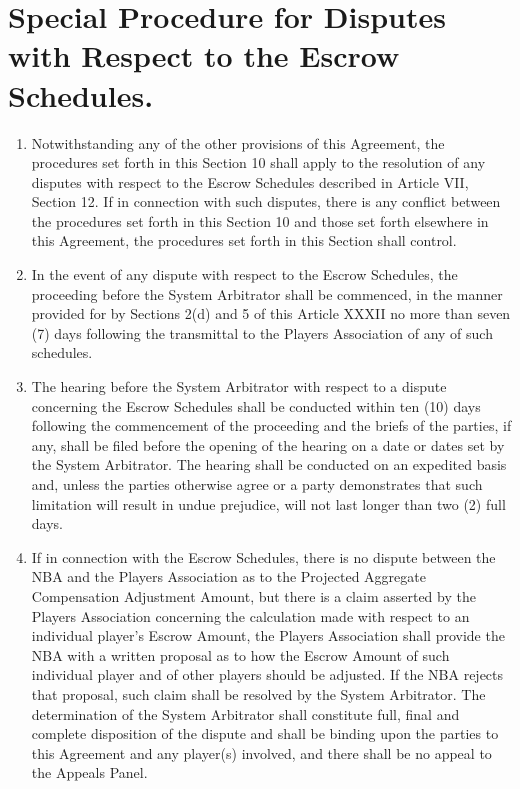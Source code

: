 \documentclass[
]{book}
\providecommand{\tightlist}{%
  \setlength{\itemsep}{0pt}\setlength{\parskip}{0pt}}
\begin{document}
\hypertarget{special-procedure-for-disputes-with-respect-to-the-escrow-schedules.}{%
\section{Special Procedure for Disputes with Respect to the Escrow Schedules.}\label{special-procedure-for-disputes-with-respect-to-the-escrow-schedules.}}

\begin{enumerate}
\def\labelenumi{(\alph{enumi})}
\tightlist
\item
  Notwithstanding any of the other provisions of this Agreement, the procedures set forth in this Section 10 shall apply to the resolution of any disputes with respect to the Escrow Schedules described in Article VII, Section 12. If in connection with such disputes, there is any conflict between the procedures set forth in this Section 10 and those set forth elsewhere in this Agreement, the procedures set forth in this Section shall control.
\item
  In the event of any dispute with respect to the Escrow Schedules, the proceeding before the System Arbitrator shall be commenced, in the manner provided for by Sections 2(d) and 5 of this Article XXXII no more than seven (7) days following the transmittal to the Players Association of any of such schedules.
\item
  The hearing before the System Arbitrator with respect to a dispute concerning the Escrow Schedules shall be conducted within ten (10) days following the commencement of the proceeding and the briefs of the parties, if any, shall be filed before the opening of the hearing on a date or dates set by the System Arbitrator. The hearing shall be conducted on an expedited basis and, unless the parties otherwise agree or a party demonstrates that such limitation will result in undue prejudice, will not last longer than two (2) full days.
\item
  If in connection with the Escrow Schedules, there is no dispute between the NBA and the Players Association as to the Projected Aggregate Compensation Adjustment Amount, but there is a claim asserted by the Players Association concerning the calculation made with respect to an individual player's Escrow Amount, the Players Association shall provide the NBA with a written proposal as to how the Escrow Amount of such individual player and of other players should be adjusted. If the NBA rejects that proposal, such claim shall be resolved by the System Arbitrator. The determination of the System Arbitrator shall constitute full, final and complete disposition of the dispute and shall be binding upon the parties to this Agreement and any player(s) involved, and there shall be no appeal to the Appeals Panel.

\end{enumerate}
\end{document}
